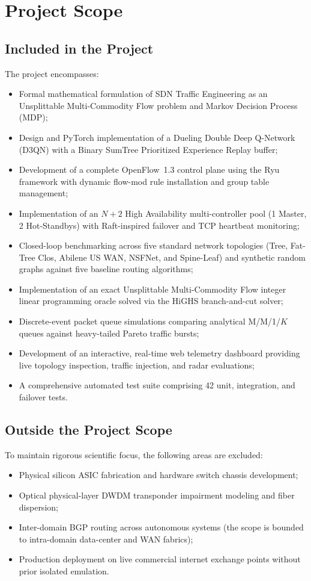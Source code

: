 \documentclass[12pt,a4paper,oneside]{report}
\begin{document}
\section{Project Scope}

\subsection{Included in the Project}
The project encompasses:
\begin{itemize}[leftmargin=8mm]
  \item Formal mathematical formulation of SDN Traffic Engineering as an Unsplittable Multi-Commodity Flow problem and Markov Decision Process (MDP);
  \item Design and PyTorch implementation of a Dueling Double Deep Q-Network (D3QN) with a Binary SumTree Prioritized Experience Replay buffer;
  \item Development of a complete OpenFlow~1.3 control plane using the Ryu framework with dynamic flow-mod rule installation and group table management;
  \item Implementation of an $N+2$ High Availability multi-controller pool (1 Master, 2 Hot-Standbys) with Raft-inspired failover and TCP heartbeat monitoring;
  \item Closed-loop benchmarking across five standard network topologies (Tree, Fat-Tree Clos, Abilene US WAN, NSFNet, and Spine-Leaf) and synthetic random graphs against five baseline routing algorithms;
  \item Implementation of an exact Unsplittable Multi-Commodity Flow integer linear programming oracle solved via the HiGHS branch-and-cut solver;
  \item Discrete-event packet queue simulations comparing analytical M/M/1/$K$ queues against heavy-tailed Pareto traffic bursts;
  \item Development of an interactive, real-time web telemetry dashboard providing live topology inspection, traffic injection, and radar evaluations;
  \item A comprehensive automated test suite comprising 42 unit, integration, and failover tests.
\end{itemize}

\subsection{Outside the Project Scope}
To maintain rigorous scientific focus, the following areas are excluded:
\begin{itemize}[leftmargin=8mm]
  \item Physical silicon ASIC fabrication and hardware switch chassis development;
  \item Optical physical-layer DWDM transponder impairment modeling and fiber dispersion;
  \item Inter-domain BGP routing across autonomous systems (the scope is bounded to intra-domain data-center and WAN fabrics);
  \item Production deployment on live commercial internet exchange points without prior isolated emulation.
\end{itemize}
\end{document}
